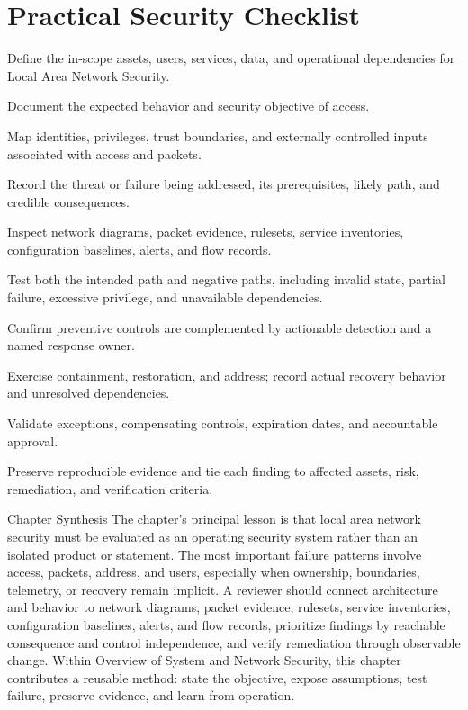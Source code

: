 \documentclass[11pt,letterpaper]{article}
\begin{document}
\section*{Practical Security Checklist}
\begin{CornellChecklist}
\item Define the in-scope assets, users, services, data, and operational dependencies for Local Area Network Security.
\item Document the expected behavior and security objective of access.
\item Map identities, privileges, trust boundaries, and externally controlled inputs associated with access and packets.
\item Record the threat or failure being addressed, its prerequisites, likely path, and credible consequences.
\item Inspect network diagrams, packet evidence, rulesets, service inventories, configuration baselines, alerts, and flow records.
\item Test both the intended path and negative paths, including invalid state, partial failure, excessive privilege, and unavailable dependencies.
\item Confirm preventive controls are complemented by actionable detection and a named response owner.
\item Exercise containment, restoration, and address; record actual recovery behavior and unresolved dependencies.
\item Validate exceptions, compensating controls, expiration dates, and accountable approval.
\item Preserve reproducible evidence and tie each finding to affected assets, risk, remediation, and verification criteria.
\end{CornellChecklist}
\begin{CornellSummaryBox}{Chapter Synthesis}
The chapter's principal lesson is that local area network security must be evaluated as an operating security system rather than an isolated product or statement. The most important failure patterns involve access, packets, address, and users, especially when ownership, boundaries, telemetry, or recovery remain implicit. A reviewer should connect architecture and behavior to network diagrams, packet evidence, rulesets, service inventories, configuration baselines, alerts, and flow records, prioritize findings by reachable consequence and control independence, and verify remediation through observable change. Within Overview of System and Network Security, this chapter contributes a reusable method: state the objective, expose assumptions, test failure, preserve evidence, and learn from operation.
\end{CornellSummaryBox}
\end{document}
